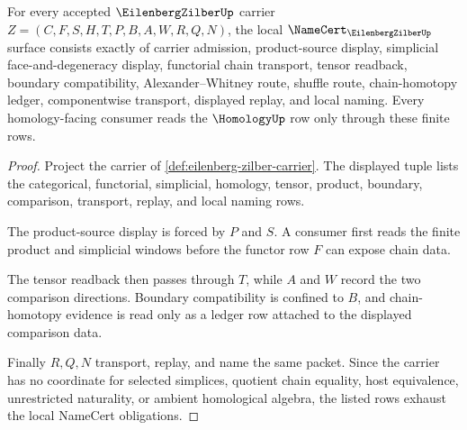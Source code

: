 \begin{theorem}
\label{thm:eilenberg-zilber-namecert-obligations}
For every accepted $\EilenbergZilberUp$ carrier $Z=(C,F,S,H,T,P,B,A,W,R,Q,N)$, the local $\NameCert_{\EilenbergZilberUp}$ surface consists exactly of carrier admission, product-source display, simplicial face-and-degeneracy display, functorial chain transport, tensor readback, boundary compatibility, Alexander--Whitney route, shuffle route, chain-homotopy ledger, componentwise transport, displayed replay, and local naming. Every homology-facing consumer reads the $\HomologyUp$ row only through these finite rows.
\end{theorem}
\begin{proof}
Project the carrier of \autoref{def:eilenberg-zilber-carrier}. The displayed tuple lists the categorical, functorial, simplicial, homology, tensor, product, boundary, comparison, transport, replay, and local naming rows.

The product-source display is forced by $P$ and $S$. A consumer first reads the finite product and simplicial windows before the functor row $F$ can expose chain data.

The tensor readback then passes through $T$, while $A$ and $W$ record the two comparison directions. Boundary compatibility is confined to $B$, and chain-homotopy evidence is read only as a ledger row attached to the displayed comparison data.

Finally $R,Q,N$ transport, replay, and name the same packet. Since the carrier has no coordinate for selected simplices, quotient chain equality, host equivalence, unrestricted naturality, or ambient homological algebra, the listed rows exhaust the local NameCert obligations.
\end{proof}

